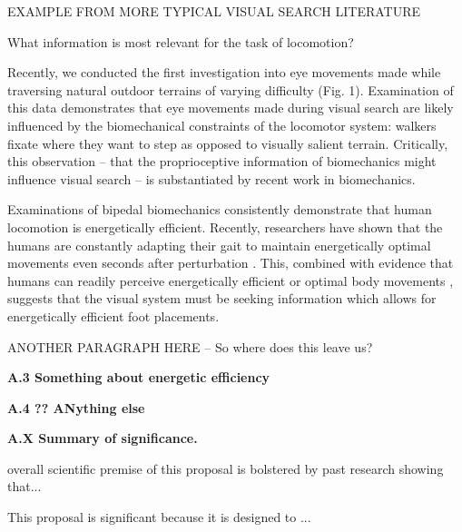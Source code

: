 EXAMPLE FROM MORE TYPICAL VISUAL SEARCH LITERATURE

What information is most relevant for the task of locomotion?

Recently, we conducted the first investigation into eye movements made while traversing natural outdoor terrains of varying difficulty \cite{Matthis2018,hayhoe2018} (Fig. 1). Examination of this data demonstrates that eye movements made during visual search are likely influenced by the biomechanical constraints of the locomotor system: walkers fixate where they want to step as opposed to visually salient terrain. Critically, this observation – that the proprioceptive information of biomechanics might influence visual search – is substantiated by recent work in biomechanics.

Examinations of bipedal biomechanics consistently demonstrate that human locomotion is energetically efficient\cite{Kuo2002,Donelan2002}. Recently, researchers have shown that the humans are constantly adapting their gait to maintain energetically optimal movements even seconds after perturbation \cite{selinger2015}. This, combined with evidence that humans can readily perceive energetically efficient\cite{warren1984} or optimal body movements \cite{weast-knapp2019}, suggests that the visual system must be seeking information which allows for energetically efficient foot placements.

ANOTHER PARAGRAPH HERE -- So where does this leave us?


\textbf{A.3 Something about energetic efficiency}

\textbf{A.4 ?? ANything else}

\textbf{A.X Summary of significance.} 

overall scientific premise of this proposal is bolstered by past research showing that...

This proposal is significant because it is designed to ...




